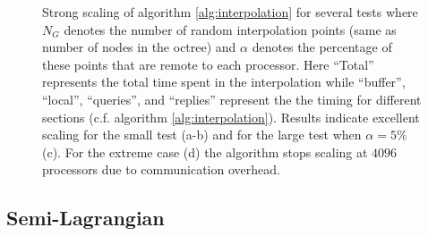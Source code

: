 \begin{figure}[htbp]
\begin{center}
	\end{center}
	\caption{Strong scaling of algorithm \ref{alg:interpolation} for several tests where $N_G$ denotes the number of random interpolation points (same as number of nodes in the octree) and $\alpha$ denotes the percentage of these points that are remote to each processor. Here ``Total'' represents the total time spent in the interpolation while ``buffer'', ``local'', ``queries'', and ``replies'' represent the the timing for different sections (c.f. algorithm \ref{alg:interpolation}). Results indicate excellent scaling for the small test (a-b) and for the large test when $\alpha = 5\%$ (c). For the extreme case (d) the algorithm stops scaling at $4096$ processors due to communication overhead.}
	\label{fig:interpolation}
\end{figure}

\subsection{Semi-Lagrangian}




